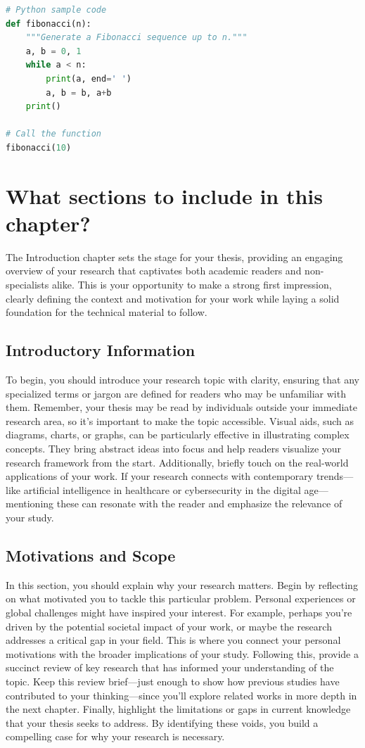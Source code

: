 \documentclass{iutbscthesis}
\begin{document}
\begin{lstlisting}[language=Python, caption={Python code for Fibonacci sequence}, label={lst:fibonacci}]
# Python sample code
def fibonacci(n):
    """Generate a Fibonacci sequence up to n."""
    a, b = 0, 1
    while a < n:
        print(a, end=' ')
        a, b = b, a+b
    print()

# Call the function
fibonacci(10)
\end{lstlisting}

\section{What sections to include in this chapter?}
The Introduction chapter sets the stage for your thesis, providing an engaging overview of your research that captivates both academic readers and non-specialists alike. This is your opportunity to make a strong first impression, clearly defining the context and motivation for your work while laying a solid foundation for the technical material to follow.

\subsection{Introductory Information}
To begin, you should introduce your research topic with clarity, ensuring that any specialized terms or jargon are defined for readers who may be unfamiliar with them. Remember, your thesis may be read by individuals outside your immediate research area, so it's important to make the topic accessible. Visual aids, such as diagrams, charts, or graphs, can be particularly effective in illustrating complex concepts. They bring abstract ideas into focus and help readers visualize your research framework from the start. Additionally, briefly touch on the real-world applications of your work. If your research connects with contemporary trends—like artificial intelligence in healthcare or cybersecurity in the digital age—mentioning these can resonate with the reader and emphasize the relevance of your study.

\subsection{Motivations and Scope}
In this section, you should explain why your research matters. Begin by reflecting on what motivated you to tackle this particular problem. Personal experiences or global challenges might have inspired your interest. For example, perhaps you're driven by the potential societal impact of your work, or maybe the research addresses a critical gap in your field. This is where you connect your personal motivations with the broader implications of your study. Following this, provide a succinct review of key research that has informed your understanding of the topic. Keep this review brief—just enough to show how previous studies have contributed to your thinking—since you'll explore related works in more depth in the next chapter. Finally, highlight the limitations or gaps in current knowledge that your thesis seeks to address. By identifying these voids, you build a compelling case for why your research is necessary.
\end{document}
